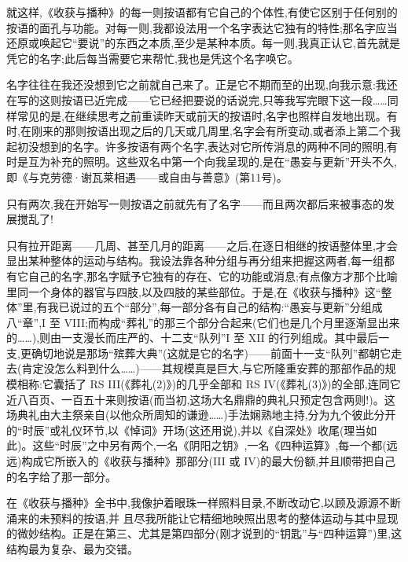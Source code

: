就这样,《收获与播种》的每一则按语都有它自己的个体性,有使它区别于任何别的按语的面孔与功能。对每一则,我都设法用一个名字表达它独有的特性;那名字应当还原或唤起它“要说”的东西之本质,至少是某种本质。每一则,我真正认它,首先就是凭它的名字;此后每当需要它来帮忙,我也是凭这个名字唤它。

名字往往在我还没想到它之前就自己来了。正是它不期而至的出现,向我示意:我还在写的这则按语已近完成——它已经把要说的话说完,只等我写完眼下这一段……同样常见的是,在继续思考之前重读昨天或前天的按语时,名字也照样自发地出现。有时,在刚来的那则按语出现之后的几天或几周里,名字会有所变动,或者添上第二个我起初没想到的名字。许多按语有两个名字,表达对它所传消息的两种不同的照明,有时是互为补充的照明。这些双名中第一个向我呈现的,是在“愚妄与更新”开头不久,即《与克劳德·谢瓦莱相遇——或自由与善意》(第11号)。

只有两次,我在开始写一则按语之前就先有了名字——而且两次都后来被事态的发展搅乱了!

只有拉开距离——几周、甚至几月的距离——之后,在逐日相继的按语整体里,才会显出某种整体的运动与结构。我设法靠各种分组与再分组来把握这两者,每一组都有它自己的名字,那名字赋予它独有的存在、它的功能或消息;有点像方才那个比喻里同一个身体的器官与四肢,以及四肢的某些部位。于是,在《收获与播种》这“整体”里,有我已说过的五个“部分”,每一部分各有自己的结构:“愚妄与更新”分组成八“章”,I 至 VIII;而构成“葬礼”的那三个部分合起来(它们也是几个月里逐渐显出来的……),则由一支漫长而庄严的、十二支“队列”I 至 XII 的行列组成。其中最后一支,更确切地说是那场“殡葬大典”(这就是它的名字)——前面十一支“队列”都朝它走去(肯定没怎么料到什么……)——其规模真是巨大,与它所隆重安葬的那部作品的规模相称:它囊括了 RS III(《葬礼(2)》)的几乎全部和 RS IV(《葬礼(3)》)的全部,连同它近八百页、一百五十来则按语(而当初,这场大名鼎鼎的典礼只预定包含两则!)。这场典礼由大主祭亲自(以他众所周知的谦逊……)手法娴熟地主持,分为九个彼此分开的“时辰”或礼仪环节,以《悼词》开场(这还用说),并以《自深处》收尾(理当如此)。这些“时辰”之中另有两个,一名《阴阳之钥》,一名《四种运算》,每一个都(远远)构成它所嵌入的《收获与播种》那部分(III 或 IV)的最大份额,并且顺带把自己的名字给了那一部分。

在《收获与播种》全书中,我像护着眼珠一样照料目录,不断改动它,以顾及源源不断涌来的未预料的按语,并
%
且尽我所能让它精细地映照出思考的整体运动与其中显现的微妙结构。正是在第三、尤其是第四部分(刚才说到的“钥匙”与“四种运算”)里,这结构最为复杂、最为交错。

